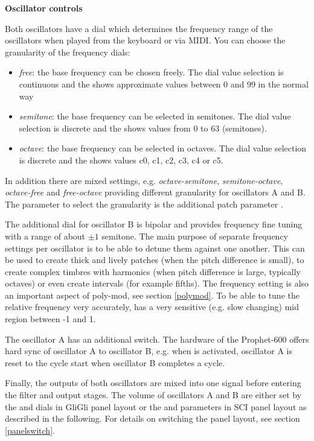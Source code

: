 \textbf{Oscillator controls}

Both oscillators have a \oscfreq dial which determines the frequency range of the oscillators when played from the keyboard or via MIDI.  You can choose the granularity of the frequency dials: 
\begin{itemize}
  \item \textit{free}: the base frequency can be chosen freely. The dial value selection is continuous and the \display shows approximate values between 0 and 99 in the normal way
  \item \textit{semitone}: the base frequency can be selected in semitones. The dial value selection is discrete and the \display shows values from 0 to 63 (semitones).   
  \item \textit{octave}: the base frequency can be selected in octaves. The dial value selection is discrete and the \display shows values c0, c1, c2, c3, c4 or c5. 
\end{itemize}  
In addition there are mixed settings, e.g. \textit{octave-semitone}, \textit{semitone-octave}, \textit{octave-free} and \textit{free-octave} providing different granularity for oscillators A and B. The parameter to select the granularity is the additional patch parameter \oscpitchmode. 

The additional \freqfine dial for oscillator B is bipolar and provides frequency fine tuning with a range of about $\pm 1$ semitone. The main purpose of separate frequency settings per oscillator is to be able to detune them against one another. This can be used to create thick and lively patches (when the pitch difference is small), to create complex timbres with harmonics (when pitch difference is large, typically octaves) or even create intervals (for example fifths). The frequency setting is also an important aspect of poly-mod, see section \ref{polymod}. To be able to tune the relative frequency very accurately, \freqfine has a very sensitive (e.g. slow changing) mid region between -1 and 1.

The oscillator A has an additional \oscsync switch. The hardware of the Prophet-600 offers hard sync of oscillator A to oscillator B, e.g. when \oscsync is activated, oscillator A is reset to the cycle start when oscillator B completes a cycle. 

Finally, the outputs of both oscillators are mixed into one signal before entering the filter and output stages. The volume of oscillators A and B are either set by the \vola and \volb dials in GliGli panel layout or the \mixer and \drive parameters in SCI panel layout as described in the following. For details on switching the panel layout, see section \ref{panelswitch}.

